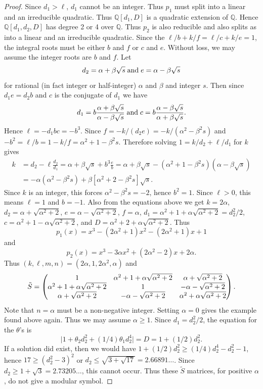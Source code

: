 \documentclass[12pt,psamsfonts]{amsart}
\newcommand{\Q}{\mathbb Q}
\newcommand{\tS}{\tilde{S}}
\numberwithin{equation}{section}
\theoremstyle{definition}
\begin{document}
\begin{proof}
Since $d_1 > \ell$, $d_1$ cannot be an integer. Thus $p_1$ must
split into a linear and an irreducible quadratic. Thus ${\Q}[d_1,D]$ is a quadratic extension of ${\Q}$.
Hence ${\Q}[d_1,d_2,D]$ has degree 2 or 4 over ${\Q}$. Thus $p_2$ is
also reducible and also splits as into a linear and an irreducible
quadratic. Since the $\ell/b+k/f=\ell/c+k/e=1$, the integral roots
must be either $b$ and $f$ or $c$ and $e$. Without loss, we may
assume the integer roots are $b$ and $f$. Let
$$d_2=\alpha+\beta{\sqrt s}\; {\rm and }\; e=\alpha-\beta{\sqrt s}$$
for rational (in fact integer or half-integer) $\alpha$ and
$\beta$ and integer $s$. Then since $d_1 e = d_2 b$ and $c$ is the
conjugate of $d_1$ we have
$$d_1=b\frac{\alpha+\beta{\sqrt s}}{\alpha-\beta{\sqrt s}}\; {\rm and }\;
c=b\frac{\alpha-\beta{\sqrt s}}{\alpha+\beta{\sqrt s}}.$$ Hence
$\ell = - d_1 b c = - b^3$. Since $f=-k/(d_2 e) =
-k/(\alpha^2-\beta^2 s)$ and $-b^2=\ell/b=1-k/f=\alpha^2+1-\beta^2
s$. Therefore solving $1=k/d_2+\ell/d_1$ for $k$ gives
\begin{equation*}
\begin{split}
k & =d_2 -\ell \frac{d_2}{d_1} = \alpha+\beta {\sqrt s} + b^3
\frac{e}{b}
= \alpha+\beta {\sqrt s} - (\alpha^2+1-\beta^2 s) (\alpha-\beta {\sqrt s})\\
& =-\alpha (\alpha^2-\beta^2 s) + \beta [\alpha^2+2-\beta^2
s]{\sqrt s}.
\end{split}
\end{equation*}
Since $k$ is an integer, this forces $\alpha^2-\beta^2 s=-2$,
hence $b^2 = 1$. Since $\ell >0$, this means $\ell=1$ and $b=-1$.
Also from the equations above we get $k=2\alpha$,
$d_2=\alpha+{\sqrt {\alpha^2 + 2}}$, $e=\alpha-{\sqrt {\alpha^2 +
2}}$, $f=\alpha$, $d_1=\alpha^2 + 1 +\alpha {\sqrt
{\alpha^2+2}}=d_2^2/2$, $c=\alpha^2 + 1 -\alpha {\sqrt
{\alpha^2+2}}$, and $D=\alpha^2 +2 +\alpha {\sqrt {\alpha^2 +2}}$.
Thus
$$p_1(x)=x^3 - (2 \alpha^2+1) x^2 - (2 \alpha^2 +1)x +1$$
and
$$p_2(x)=x^3 - 3\alpha x^2 + (2\alpha^2 -2) x +2\alpha.$$
Thus $(k,\ell,m,n)=(2\alpha, 1, 2\alpha^2, \alpha)$ and
$$\tS=\left( \begin{matrix} 1 &
\alpha^2+1+\alpha {\sqrt {\alpha^2 +2}} & \alpha+{\sqrt
{\alpha^2+2}} \cr \alpha^2+1+\alpha {\sqrt {\alpha^2 +2}} & 1 &
-\alpha-{\sqrt {\alpha^2+2}} \cr \alpha+ {\sqrt {\alpha^2 +2}} &
-\alpha-{\sqrt {\alpha^2+2}} & \alpha^2+\alpha {\sqrt {\alpha^2
+2}}\end{matrix}\right).$$ Note that $n=\alpha$ must be a
non-negative integer. Setting $\alpha=0$ gives the example found
above again. Thus we may assume $\alpha\ge 1$. Since
$d_1=d_2^2/2$, the equation for the $\theta$'s is
$$\vert 1+\theta_2 d_2^2 + (1/4) \theta_1 d_2^4\vert = D = 1 + (1/2) d_2^2.$$
If a solution did exist, then we would have $1+ (1/2) d_2^2 \ge
(1/4) d_2^4 - d_2^2 -1$, hence $17\ge (d_2^2-3)^2$ or $d_2 \le
{\sqrt {3+ \sqrt {17}}}=2.66891\dots$. Since $d_2 \ge 1+ {\sqrt
{3}} =2.73205\dots$, this cannot occur. Thus these $\tS$ matrices,
for positive $\alpha$, do not give a modular symbol.


\end{proof}
\end{document}
